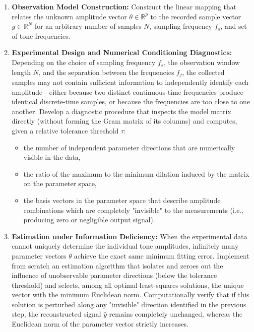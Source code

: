 \documentclass[12pt, letterpaper]{article}
\begin{document}
\begin{enumerate}
    \item \textbf{Observation Model Construction:} Construct the linear mapping that relates the unknown amplitude vector $\theta \in \mathbb{R}^p$ to the recorded sample vector $y \in \mathbb{R}^N$ for an arbitrary number of samples $N$, sampling frequency $f_s$, and set of tone frequencies.   
    \item \textbf{Experimental Design and Numerical Conditioning Diagnostics:} Depending on the choice of sampling frequency $f_s$, the observation window length $N$, and the separation between the frequencies $f_j$, the collected samples may not contain sufficient information to independently identify each amplitude—either because two distinct continuous-time frequencies produce identical discrete-time samples, or because the frequencies are too close to one another. Develop a diagnostic procedure that inspects the model matrix directly (without forming the Gram matrix of its columns) and computes, given a relative tolerance threshold $\tau$:   
    \begin{itemize}
        \item the number of independent parameter directions that are numerically visible in the data,   
        \item the ratio of the maximum to the minimum dilation induced by the matrix on the parameter space,   
        \item the basis vectors in the parameter space that describe amplitude combinations which are completely "invisible" to the measurements (i.e., producing zero or negligible output signal).   
    \end{itemize}
    \item \textbf{Estimation under Information Deficiency:} When the experimental data cannot uniquely determine the individual tone amplitudes, infinitely many parameter vectors $\theta$ achieve the exact same minimum fitting error. Implement from scratch an estimation algorithm that isolates and zeroes out the influence of unobservable parameter directions (below the tolerance threshold) and selects, among all optimal least-squares solutions, the unique vector with the minimum Euclidean norm. Computationally verify that if this solution is perturbed along any "invisible" direction identified in the previous step, the reconstructed signal $\hat{y}$ remains completely unchanged, whereas the Euclidean norm of the parameter vector strictly increases.   
\end{enumerate}
\end{document}
